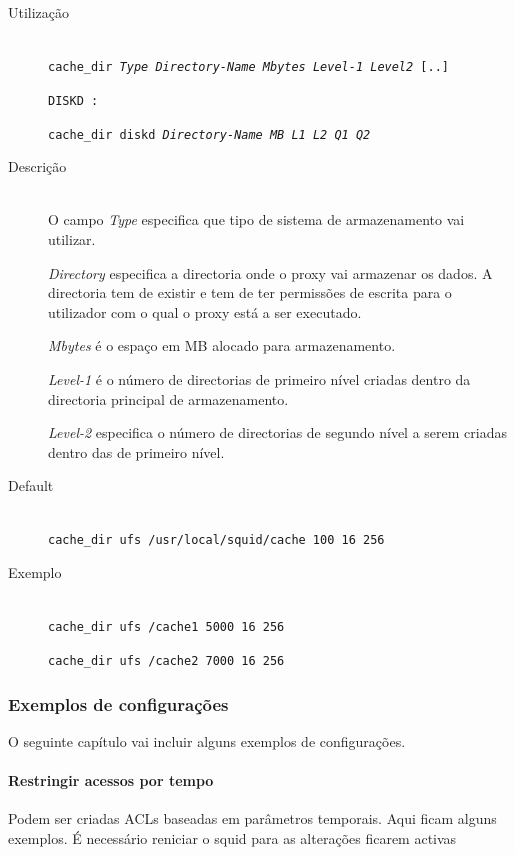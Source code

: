 
\begin{description}
\item[Utilização]~\\
\texttt{cache\_dir \emph{Type} \emph{Directory-Name} \emph{Mbytes}
\emph{Level-1} \emph{Level2} [..]}

\texttt{DISKD :}

\texttt{cache\_dir diskd \emph{Directory-Name} \emph{MB} \emph{L1}
\emph{L2} \emph{Q1} \emph{Q2}}

\item[Descrição]~\\
O campo \emph{Type} especifica que tipo de sistema de armazenamento vai
utilizar.

\emph{Directory} especifica a directoria onde o proxy vai armazenar os dados.
A directoria tem de existir e tem de ter permissões de escrita para o
utilizador com o qual o proxy está a ser executado.

\emph{Mbytes} é o espaço em MB alocado para armazenamento.

\emph{Level-1} é o número de directorias de primeiro nível criadas
dentro da directoria principal de armazenamento.

\emph{Level-2} especifica o número de directorias de segundo nível a
serem criadas dentro das de primeiro nível.

\item[Default]~\\
\texttt{cache\_dir ufs /usr/local/squid/cache 100 16 256}

\item[Exemplo]~\\
\texttt{cache\_dir ufs /cache1 5000 16 256}

\texttt{cache\_dir ufs /cache2 7000 16 256}
\end{description}

\subsubsection{Exemplos de configurações}

O seguinte capítulo vai incluir alguns exemplos de
configurações.

\paragraph{Restringir acessos por tempo}

Podem ser criadas ACLs baseadas em parâmetros temporais.
Aqui ficam alguns exemplos.
É necessário reniciar o squid para as alterações ficarem
activas

